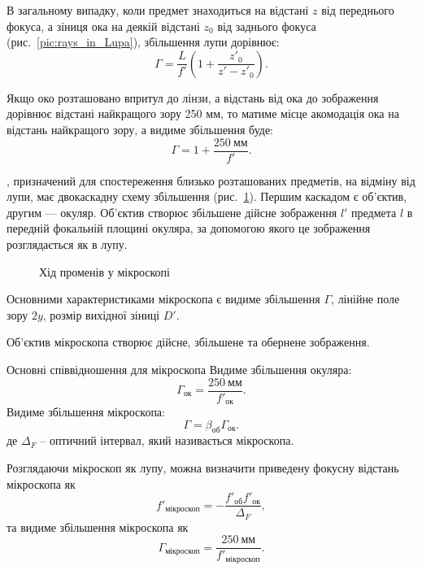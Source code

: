 В загальному випадку, коли предмет знаходиться на відстані $z$ від
переднього фокуса, а зіниця ока на деякій відстані $z_0$ від заднього фокуса
(рис.~\ref{pic:rays_in_Lupa}), збільшення лупи дорівнює:
\begin{equation}\label{key}
	\Gamma = \frac{L}{f'}\left(1 + \frac{z'_0}{z' - z'_0}\right).
\end{equation}


Якщо око розташовано впритул до лінзи, а відстань від ока до зображення
дорівнює відстані найкращого зору 250 мм, то матиме місце акомодація  ока на відстань найкращого зору, а видиме збільшення буде:
\begin{equation*}
	\Gamma = 1 + \frac{250\ \text{мм}}{f'}.
\end{equation*}

, призначений для спостереження близько розташованих
предметів, на відміну від лупи, має двокаскадну схему збільшення
(рис.~\ref{pic:microscope}). Першим каскадом є об’єктив, другим --- окуляр. Об’єктив створює збільшене дійсне зображення $l'$ предмета $l$ в передній фокальній площині окуляра, за допомогою якого це зображення розглядається як в лупу.


\begin{figure}[htbp!]\centering
	
	\caption{Хід променів у мікроскопі}
	\label{pic:microscope}
\end{figure}


Основними характеристиками мікроскопа є видиме збільшення $\Gamma$, лінійне поле зору $2y$, розмір вихідної зіниці $D'$.

Об'єктив мікроскопа створює дійсне, збільшене та
обернене зображення.
\begin{Theory}{Основні співвідношення для мікроскопа}
	Видиме збільшення окуляра:
	\begin{equation}
		\Gamma_\text{ок} = \frac{250\ \text{мм}}{f'_\text{ок}}.
	\end{equation}
	Видиме збільшення мікроскопа:
	\begin{equation}\label{eq:microscope_apparent_increase}
		\Gamma = \beta_\text{об} \Gamma_\text{ок}.
	\end{equation}
	де $\Delta_F$ -- оптичний інтервал, який називається 
	мікроскопа.

	Розглядаючи мікроскоп як лупу, можна визначити приведену фокусну
	відстань мікроскопа як
	\begin{equation}\label{}
		f'_\text{мікроскоп} = - \frac{f'_\text{об}f'_\text{ок}}{\Delta_F},
	\end{equation}
	та видиме збільшення мікроскопа як
	\begin{equation}
		\Gamma_\text{мікроскоп} = \frac{250\ \text{мм}}{f'_\text{мікроскоп}}.
	\end{equation}
\end{Theory}

